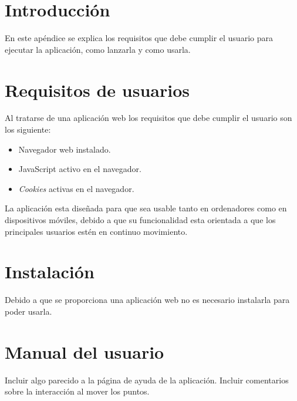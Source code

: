 
\section{Introducción}
En este apéndice se explica los requisitos que debe cumplir el usuario para ejecutar la aplicación, como lanzarla y como usarla.

\section{Requisitos de usuarios}
Al tratarse de una aplicación web los requisitos que debe cumplir el usuario son los siguiente:
\begin{itemize}
	\item Navegador web instalado.
	\item JavaScript activo en el navegador.
	\item \textit{Cookies} activas en el navegador.
\end{itemize}

La aplicación esta diseñada para que sea usable tanto en ordenadores como en dispositivos móviles, debido a que su funcionalidad esta orientada a que los principales usuarios estén en continuo movimiento.

\section{Instalación}
Debido a que se proporciona una aplicación web no es necesario instalarla para poder usarla.

\section{Manual del usuario}
Incluir algo parecido a la página de ayuda de la aplicación.
Incluir comentarios sobre la interacción al mover los puntos.

